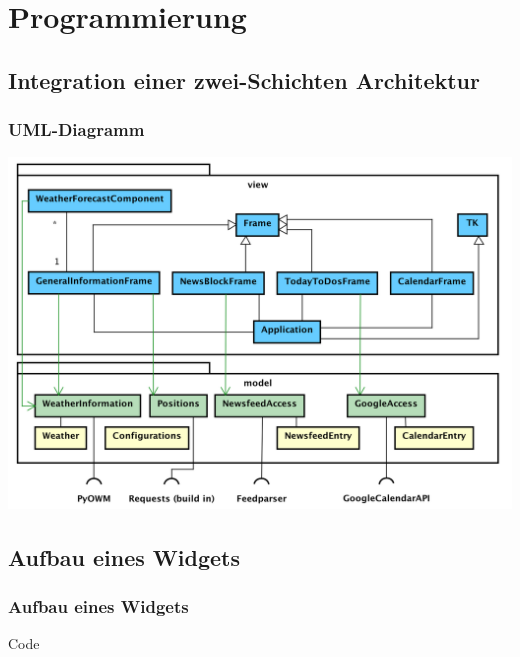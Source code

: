 \documentclass[11pt]{beamer}
\begin{document}
	\section{Programmierung}
	\subsection{Integration einer zwei-Schichten Architektur}
	\begin{frame}
		\frametitle{UML-Diagramm}
		\begin{center}
			\includegraphics[height=.7\paperheight]{images/umlDiagram}
		\end{center}
	\end{frame}

	\subsection{Aufbau eines Widgets}
\begin{frame}[fragile]
	\frametitle{Aufbau eines Widgets}
		
\begin{block}{Code}

\end{block}
\end{frame}
\end{document}
